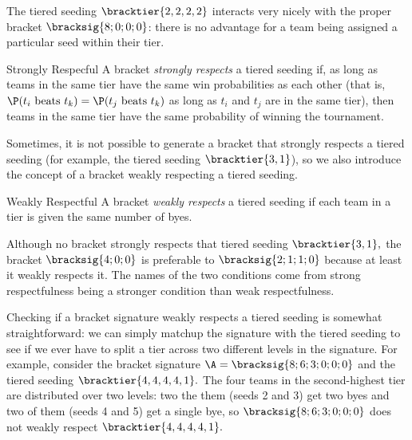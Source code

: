 {    The tiered seeding $\bracktier{2,2,2,2}$ interacts very nicely with the proper bracket $\bracksig{8;0;0;0}$: there is no advantage for a team being assigned a particular seed within their tier.

    \begin{definition}{Strongly Respecful}{}
        A bracket \textit{strongly respects} a tiered seeding if, as long as teams in the same tier have the same win probabilities as each other (that is, $\P(t_i \textrm{ beats } t_k) = \P(t_j \textrm{ beats } t_k)$ as long as $t_i$ and $t_j$ are in the same tier), then teams in the same tier have the same probability of winning the tournament.
    \end{definition}

    Sometimes, it is not possible to generate a bracket that strongly respects a tiered seeding (for example, the tiered seeding $\bracktier{3, 1}$), so we also introduce the concept of a bracket weakly respecting a tiered seeding.

    \begin{definition}{Weakly Respectful}{}
        A bracket \textit{weakly respects} a tiered seeding if each team in a tier is given the same number of byes.
    \end{definition}

    Although no bracket strongly respects that tiered seeding $\bracktier{3, 1},$ the bracket $\bracksig{4;0;0}$ is preferable to $\bracksig{2;1;1;0}$ because at least it weakly respects it. The names of the two conditions come from strong respectfulness being a stronger condition than weak respectfulness.


    Checking if a bracket signature weakly respects a tiered seeding is somewhat straightforward: we can simply matchup the signature with the tiered seeding to see if we ever have to split a tier across two different levels in the signature. For example, consider the bracket signature $\A = \bracksig{8;6;3;0;0;0}$ and the tiered seeding $\bracktier{4,4,4,4,1}.$ The four teams in the second-highest tier are distributed over two levels: two the them (seeds 2 and 3) get two byes and two of them (seeds 4 and 5) get a single bye, so $\bracksig{8;6;3;0;0;0}$ does not weakly respect $\bracktier{4,4,4,4,1}.$

}
